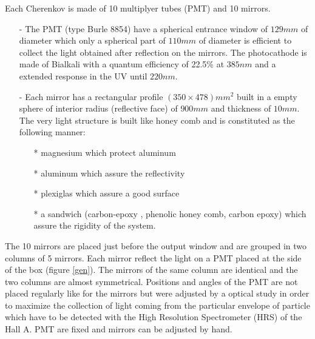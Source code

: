 \documentclass[12pt]{article}
\begin{document}
Each Cherenkov is made of 10 multiplyer tubes (PMT) and 10 mirrors.
\begin{itemize}
\item[-] The PMT (type Burle 8854) have a spherical entrance window of
$129mm$ of diameter which only a spherical part of $110mm$ of diameter is
efficient to collect the light obtained after reflection on the mirrors. 
The photocathode is made of Bialkali with a quantum efficiency of 22.5\% 
at $385nm$ and a extended response in the UV until $220 nm$.
\item[-] Each mirror has a rectangular profile $(350 \times 478) mm^2$
built in a empty sphere of interior radius (reflective face) 
of $900mm$ and thickness of $10mm$. The very light structure is built
like honey comb and is constituted as the following manner:
\begin{itemize}
\item[*] magnesium which protect aluminum
\item[*] aluminum which assure the reflectivity
\item[*] plexiglas which assure a good surface 
\item[*] a sandwich (carbon-epoxy , phenolic honey comb, carbon epoxy) which
assure the rigidity of the system.
\end{itemize}
\end{itemize}
The 10 mirrors are placed just before the output window and are grouped in
two columns of 5 mirrors. Each mirror reflect the light on a PMT placed at the
side of the box (figure \ref{gen}). The mirrors of the same column are
identical and the two
columns are almost symmetrical. Positions and angles of the PMT are not placed
regularly like for the mirrors but were adjusted by a optical study in order to
maximize the collection of light coming from the particular envelope of
particle which have to be detected with the High Resolution Spectrometer
(HRS) of the Hall A. PMT are fixed and mirrors can
be adjusted by hand.
\end{document}
